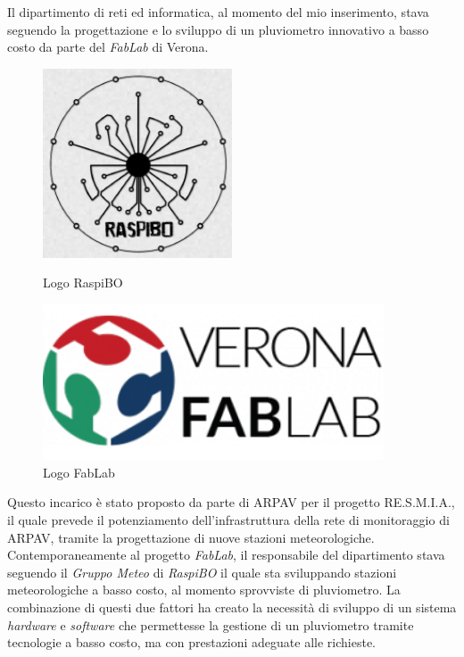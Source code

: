 Il dipartimento di reti ed informatica, al momento del mio inserimento, stava seguendo la progettazione e lo sviluppo di un pluviometro innovativo a basso costo da parte del \textit{FabLab} di Verona.
\begin{figure}[htbp]
\centering
\begin{minipage}[c]{.30\textwidth}
	\centering\setlength{\captionmargin}{0pt}%
	\includegraphics[width=0.50\textwidth]{./capitoli/capitolo2/img/raspibo}
	\caption{Logo RaspiBO}
\end{minipage}%
\hspace{10mm}
\begin{minipage}[c]{.30\textwidth}
	\centering\setlength{\captionmargin}{0pt}%
	\includegraphics[width=0.90\textwidth]{./capitoli/capitolo2/img/fablab}
	\caption{Logo FabLab}
\end{minipage}%
\end{figure} Questo incarico è stato proposto da parte di ARPAV per il progetto RE.S.M.I.A., il quale prevede il potenziamento dell'infrastruttura della rete di monitoraggio di ARPAV, tramite la progettazione di nuove stazioni meteorologiche. 
Contemporaneamente al progetto \textit{FabLab}, il responsabile del dipartimento stava seguendo il \textit{Gruppo Meteo} di \textit{RaspiBO} il quale sta sviluppando stazioni meteorologiche a basso costo, al momento sprovviste di pluviometro. La combinazione di questi due fattori ha creato la necessità di sviluppo di un sistema \textit{hardware} e \textit{software} che permettesse la gestione di un pluviometro tramite tecnologie a basso costo, ma con prestazioni adeguate alle richieste.




